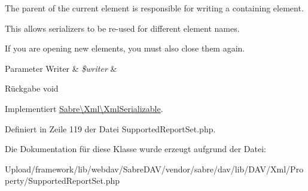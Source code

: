 The parent of the current element is responsible for writing a containing element.

This allows serializers to be re-\/used for different element names.

If you are opening new elements, you must also close them again.


\begin{DoxyParams}[1]{Parameter}
Writer & {\em \$writer} & \\
\hline
\end{DoxyParams}
\begin{DoxyReturn}{Rückgabe}
void 
\end{DoxyReturn}


Implementiert \mbox{\hyperlink{interface_sabre_1_1_xml_1_1_xml_serializable_aa78f3ee43aa699be8347181653a53d8c}{Sabre\textbackslash{}\+Xml\textbackslash{}\+Xml\+Serializable}}.



Definiert in Zeile 119 der Datei Supported\+Report\+Set.\+php.



Die Dokumentation für diese Klasse wurde erzeugt aufgrund der Datei\+:\begin{DoxyCompactItemize}
\item 
Upload/framework/lib/webdav/\+Sabre\+D\+A\+V/vendor/sabre/dav/lib/\+D\+A\+V/\+Xml/\+Property/Supported\+Report\+Set.\+php\end{DoxyCompactItemize}
